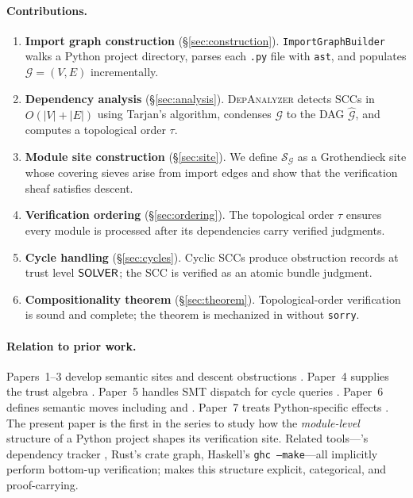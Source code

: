 \documentclass[11pt]{article}
\newcommand{\IG}{\mathcal{G}}              %
\newcommand{\DA}{\textsc{DepAnalyzer}}     %
\newcommand{\TopoOrd}{\tau}                %
\newcommand{\CondGraph}{\widehat{\IG}}     %
\newcommand{\ModSite}{\mathcal{S}_{\IG}}   %
\begin{document}
\paragraph{Contributions.}
\begin{enumerate}[label=(\roman*)]
  \item \textbf{Import graph construction}
        (\S\ref{sec:construction}).
        \texttt{ImportGraphBuilder} walks a Python project directory,
        parses each \texttt{.py} file with \texttt{ast}, and populates
        $\IG = (V, E)$ incrementally.

  \item \textbf{Dependency analysis}
        (\S\ref{sec:analysis}).
        \DA{} detects SCCs in $O(|V|+|E|)$ using Tarjan's algorithm,
        condenses $\IG$ to the DAG $\CondGraph$, and computes
        a topological order $\TopoOrd$.

  \item \textbf{Module site construction}
        (\S\ref{sec:site}).
        We define $\ModSite$ as a Grothendieck site whose covering
        sieves arise from import edges and show that the verification
        sheaf satisfies descent.

  \item \textbf{Verification ordering}
        (\S\ref{sec:ordering}).
        The topological order $\TopoOrd$ ensures every module is
        processed after its dependencies carry verified judgments.

  \item \textbf{Cycle handling}
        (\S\ref{sec:cycles}).
        Cyclic SCCs produce obstruction records at trust level
        $\mathsf{SOLVER}$; the SCC is verified as an atomic bundle judgment.

  \item \textbf{Compositionality theorem}
        (\S\ref{sec:theorem}).
        Topological-order verification is sound and complete; the
        theorem is mechanized in \LEAN{} without \texttt{sorry}.
\end{enumerate}

\paragraph{Relation to prior work.}
Papers~1--3 develop semantic sites and descent obstructions
\cite{paper01,paper02,paper03}.  Paper~4 supplies the trust algebra
\cite{paper04}.  Paper~5 handles SMT dispatch for cycle queries
\cite{paper05}.  Paper~6 defines semantic moves including \GLUE{} and
\REPAIR{} \cite{paper06}.  Paper~7 treats Python-specific effects
\cite{paper07}.  The present paper is the first in the series to study
how the \emph{module-level} structure of a Python project shapes its
verification site.  Related tools—\Dafny{}'s dependency tracker
\cite{dafny}, Rust's crate graph, Haskell's \texttt{ghc --make}—all
implicitly perform bottom-up verification; \JuGeo{} makes this structure
explicit, categorical, and proof-carrying.
\end{document}
